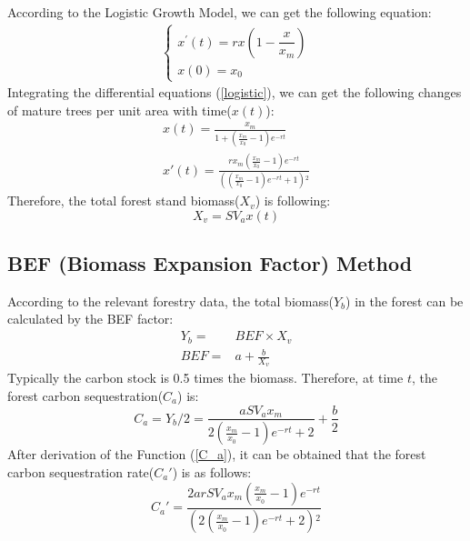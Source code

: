 \documentclass[12pt]{article}
\begin{document}
According to the Logistic Growth Model, we can get the following equation:
\begin{align}
    \left\{
    \begin{array}{l}
        x^\prime\left(t\right)=rx\left(1-\dfrac{x}{x_m}\right) \\
        x(0)=x_0
    \end{array} \right.
    \label{logistic}
\end{align}
Integrating the differential equations (\ref{logistic}), we can get the following changes of mature trees per unit area with time($x(t)$):
\begin{align}
    x(t)=\frac{x_m}{1+(\frac{x_m}{x_0}-1)e^{-rt}} \\
    x'(t)=\frac{r x_m \left(\frac{x_m}{x_0}-1\right) e^{-r t}}{\left(\left(\frac{x_m}{x_0}-1\right) e^{-r t}+1\right){}^2} \label{speed}
\end{align}
Therefore, the total forest stand biomass($X_v$) is following:
\begin{equation}
    X_v=SV_ax(t)
\end{equation}
\subsection{BEF (Biomass Expansion Factor) Method}
According to the relevant forestry data, the total biomass($Y_b$) in the forest
can be calculated by the BEF factor\cite{Fang}:
\begin{align}
    Y_b= & BEF\times X_v   \\
    BEF= & a+\frac{b}{X_v}
\end{align}
Typically the carbon stock is 0.5 times the biomass. Therefore, at time $t$, the forest carbon sequestration($C_a$) is:
\begin{equation}
    C_a=Y_b/2=\frac{a S V_a x_m}{2\left(\frac{x_m}{x_0}-1\right) e^{-r t}+2}+\frac{b}{2}
    \label{C_a}
\end{equation}
After derivation of the Function (\ref{C_a}), it can be obtained that the forest carbon sequestration rate($C_a'$) is as follows:
\begin{equation}\label{C_a'}
    C_a'=\frac{2 a r S V_a x_m \left(\frac{x_m}{x_0}-1\right) e^{-r t}}{\left(2 \left(\frac{x_m}{x_0}-1\right) e^{-r t}+2\right){}^2}
\end{equation}
\end{document}
